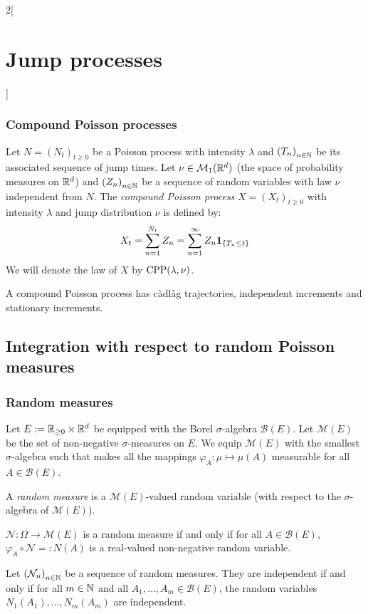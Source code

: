 \documentclass[../../../main_math.tex]{subfiles}
\begin{document}
\begin{multicols}{2}[\section{Jump processes}]
  \subsubsection{Compound Poisson processes}
  \begin{definition}
    Let $N={(N_t)}_{t\geq 0}$ be a Poisson process with intensity $\lambda$ and ${(T_n)}_{n\in\mathbb{N}}$ be its associated sequence of jump times. Let $\nu\in\mathcal{M}_1(\mathbb{R}^d)$ (the space of probability measures on $\mathbb{R}^d$) and ${(Z_n)}_{n\in\mathbb{N}}$ be a sequence of \iid random variables with law $\nu$ independent from $N$. The \emph{compound Poisson process} $X={(X_t)}_{t\geq 0}$ with intensity $\lambda$ and jump distribution $\nu$ is defined by:
    $$
      X_t=\sum_{n=1}^{N_t}Z_n=\sum_{n=1}^{\infty}Z_n\boldsymbol{\mathrm{1}}_{\{T_n\leq t\}}
    $$
    We will denote the law of $X$ by $\mathrm{CPP}(\lambda,\nu)$.
  \end{definition}
  \begin{proposition}
    A compound Poisson process has càdlàg trajectories, independent increments and stationary increments.
  \end{proposition}
  \subsection{Integration with respect to random Poisson measures}
  \subsubsection{Random measures}
  \begin{definition}
    Let $E:=\mathbb{R}_{\geq 0}\times \mathbb{R}^d$ be equipped with the Borel $\sigma$-algebra $\mathcal{B}(E)$. Let $\mathcal{M}(E)$ be the set of non-negative $\sigma$-measures on $E$. We equip $\mathcal{M}(E)$ with the smallest $\sigma$-algebra such that makes all the mappings $\varphi_A:\mu\mapsto\mu(A)$ measurable for all $A\in\mathcal{B}(E)$.
  \end{definition}
  \begin{definition}
    A \emph{random measure} is a $\mathcal{M}(E)$-valued random variable (with respect to the $\sigma$-algebra of $\mathcal{M}(E)$).
  \end{definition}
  \begin{proposition}
    $\mathcal{N}:\Omega\to\mathcal{M}(E)$ is a random measure if and only if for all $A\in\mathcal{B}(E)$, $\varphi_A\circ \mathcal{N}=:N(A)$ is a real-valued non-negative random variable.
  \end{proposition}
  \begin{proposition}
    Let ${(\mathcal{N}_n)}_{n\in\mathbb{N}}$ be a sequence of random measures. They are independent if and only if for all $m\in\mathbb{N}$ and all $A_1,\ldots,A_m\in\mathcal{B}(E)$, the random variables $N_1(A_1),\ldots,N_m(A_m)$ are independent.
  \end{proposition}

\end{multicols}
\end{document}
